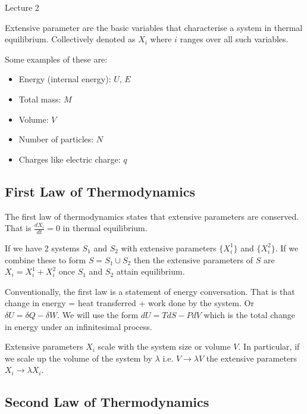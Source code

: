 \begin{center}

Lecture 2

\end{center}

Extensive parameter are the basic variables that characterise a system in thermal equilibrium. Collectively denoted as $X_i$ where $i$ ranges over all such variables.

Some examples of these are:

\begin{itemize}

\item Energy (internal energy): $U$, $E$
\item Total mass: $M$
\item Volume: $V$
\item Number of particles: $N$
\item Charges like electric charge: $q$

\end{itemize}

\subsection{First Law of Thermodynamics}

The first law of thermodynamics states that extensive parameters are conserved. That is $\frac{d X_i}{dt} = 0$ in thermal equilibrium.

If we have 2 systems $S_1$ and $S_2$ with extensive parameters $\{ X_i^1\}$ and $\{ X_i^2 \}$. If we combine these to form $S = S_1 \cup S_2$ then the extensive parameters of $S$ are $X_i = X_i^1 + X_i^2$ once $S_1$ and $S_2$ attain equilibrium.

Conventionally, the first law is a statement of energy conversation. That is that change in energy = heat transferred + work done by the system. Or $\delta U = \delta Q - \delta W$. We will use the form $dU = T dS - P dV$ which is the total change in energy under an infinitesimal process.

Extensive parameters $X_i$ scale with the system size or volume $V$. In particular, if we scale up the volume of the system by $\lambda$ i.e. $V \rightarrow \lambda V$ the extensive parameters $X_i \rightarrow \lambda X_i$.

\subsection{Second Law of Thermodynamics}


